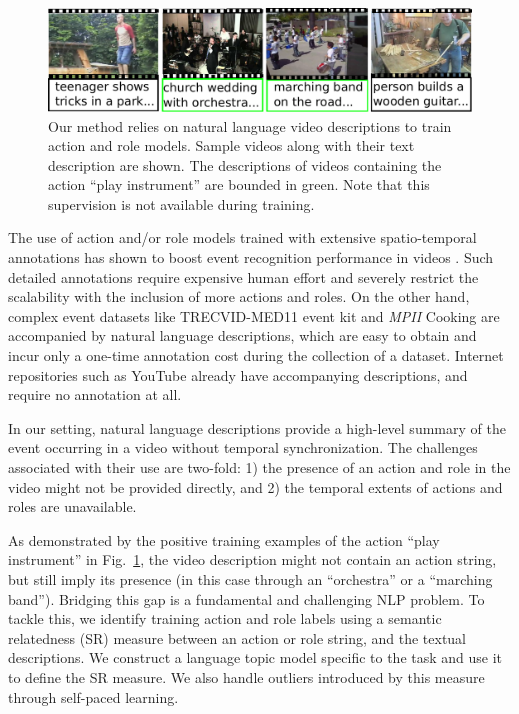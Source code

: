 \documentclass[10pt,twocolumn,letterpaper]{article}
\begin{document}
\begin{figure}[ht!]
\centering
   \includegraphics[scale = 0.4]{../images/pullFigure_2.pdf}
      \caption{Our method relies on natural language video descriptions to
      train action and role models. Sample videos along with their text
      description are shown. The descriptions of videos containing the action
      ``play instrument'' are bounded in green.
      Note that this supervision is not available during training.}
\label{fig:pull_figure}
\end{figure}

The use of action and/or role models trained with extensive spatio-temporal
annotations has shown to boost event recognition performance in videos
\cite{Izadinia_ECCV12, Lan_CVPR12}. Such detailed annotations require expensive
human effort and severely restrict the scalability with the inclusion of more
actions and roles.
On the other hand, complex event datasets like TRECVID-MED11 \cite{MED11} event kit and \textit{MPII} Cooking
\cite{Regneri_TACL13} are accompanied by natural language descriptions,
which are easy to obtain and incur only a one-time annotation cost during the
collection of a dataset.
Internet repositories such as YouTube already have accompanying descriptions,
and require no annotation at all.

In our setting,
natural language descriptions provide a high-level summary of the event
occurring in a video without temporal synchronization. The
challenges associated with their use are two-fold: 1) the presence of an action
and role in the video might not be provided directly, and 2) the temporal extents
of actions and roles are unavailable.

As demonstrated by the positive training examples of the action
``play instrument'' in Fig.~\ref{fig:pull_figure}, the video description might
not contain an action string, but still imply its presence (in this
case through an ``orchestra'' or a ``marching band'').
Bridging this gap is a fundamental and challenging NLP problem.
To tackle this, we identify training action and role labels using a semantic
relatedness (SR) measure between an action or role string, and the textual
descriptions. We construct a language topic model specific to the task and use it to
define the SR measure. We also handle outliers introduced by this measure
through self-paced learning.
\end{document}

